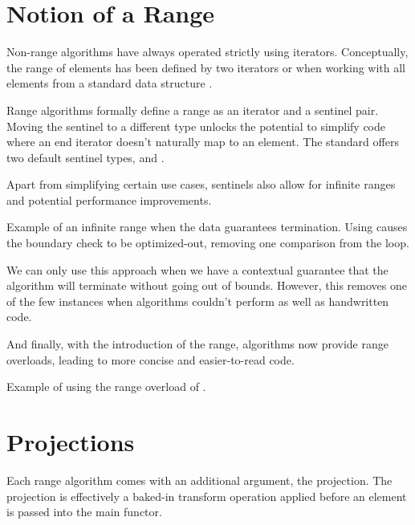 \section{Notion of a Range}

Non-range algorithms have always operated strictly using iterators. Conceptually, the range of elements has been defined by two iterators \cpp{[first, last)} or when working with all elements from a standard data structure \cpp{[begin, end)}.

Range algorithms formally define a range as an iterator and a sentinel pair. Moving the sentinel to a different type unlocks the potential to simplify code where an end iterator doesn't naturally map to an element. The standard offers two default sentinel types,  and .

Apart from simplifying certain use cases, sentinels also allow for infinite ranges and potential performance improvements.

\begin{codebox}[]{\href{https://compiler-explorer.com/z/6o5M9fqE7}{\ExternalLink}}
\footnotesize Example of an infinite range when the data guarantees termination. Using  causes the boundary check to be optimized-out, removing one comparison from the loop.
\tcblower
{}
\end{codebox}

We can only use this approach when we have a contextual guarantee that the algorithm will terminate without going out of bounds. However, this removes one of the few instances when algorithms couldn't perform as well as handwritten code.

And finally, with the introduction of the range, algorithms now provide range overloads, leading to more concise and easier-to-read code.

\begin{codebox}[]{\href{https://compiler-explorer.com/z/47h5MMKKv}{\ExternalLink}}
\footnotesize Example of using the range overload of .
\tcblower
{}
\end{codebox}

\section{Projections}

Each range algorithm comes with an additional argument, the projection.
The projection is effectively a baked-in transform operation applied before an element is passed into the main functor.

